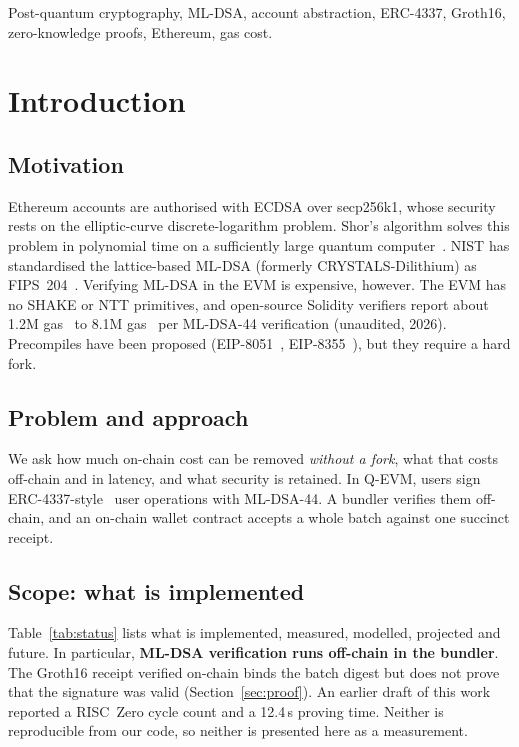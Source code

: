\documentclass[conference]{IEEEtran}
\begin{document}
\begin{IEEEkeywords}
Post-quantum cryptography, ML-DSA, account abstraction, ERC-4337, Groth16, zero-knowledge proofs, Ethereum, gas cost.
\end{IEEEkeywords}

\section{Introduction}

\subsection{Motivation}
Ethereum accounts are authorised with ECDSA over secp256k1, whose security rests on the elliptic-curve discrete-logarithm problem. Shor's algorithm solves this problem in polynomial time on a sufficiently large quantum computer~\cite{shor1994}. NIST has standardised the lattice-based ML-DSA (formerly CRYSTALS-Dilithium) as FIPS~204~\cite{fips204}. Verifying ML-DSA in the EVM is expensive, however. The EVM has no SHAKE or NTT primitives, and open-source Solidity verifiers report about 1.2M gas~\cite{fireblocks2026evmmldsa,zknox2026ethdilithium} to 8.1M gas~\cite{zknox2026ethdilithium} per ML-DSA-44 verification (unaudited, 2026). Precompiles have been proposed (EIP-8051~\cite{eip8051}, EIP-8355~\cite{eip8355}), but they require a hard fork.

\subsection{Problem and approach}
We ask how much on-chain cost can be removed \emph{without a fork}, what that costs off-chain and in latency, and what security is retained. In Q-EVM, users sign ERC-4337-style~\cite{eip4337} user operations with ML-DSA-44. A bundler verifies them off-chain, and an on-chain wallet contract accepts a whole batch against one succinct receipt.

\subsection{Scope: what is implemented}
Table~\ref{tab:status} lists what is implemented, measured, modelled, projected and future. In particular, \textbf{ML-DSA verification runs off-chain in the bundler}. The Groth16 receipt verified on-chain binds the batch digest but does not prove that the signature was valid (Section~\ref{sec:proof}). An earlier draft of this work reported a RISC~Zero cycle count and a 12.4\,s proving time. Neither is reproducible from our code, so neither is presented here as a measurement.
\end{document}
